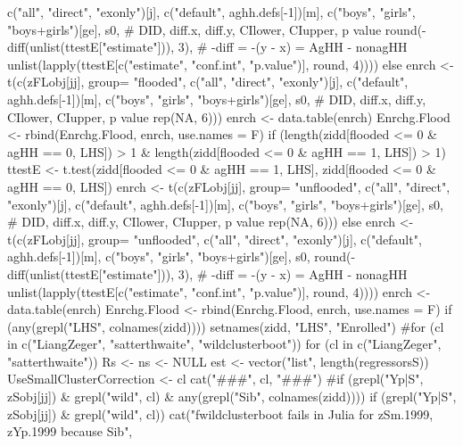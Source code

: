 \begin{Schunk}
\begin{Sinput}
{{{{{{{                  c("all", "direct", "exonly")[j], c("default", aghh.defs[-1])[m],
                  c("boys", "girls", "boys+girls")[ge], s0,
                    # DID, diff.x, diff.y, CIlower, CIupper, p value
                  round(-diff(unlist(ttestE["estimate"])), 3), # -diff = -(y - x) = AgHH - nonagHH
                  unlist(lapply(ttestE[c("estimate", "conf.int", "p.value")], round, 4))))
              } else 
                enrch <- t(c(zFLobj[jj], group= "flooded",
                  c("all", "direct", "exonly")[j], c("default", aghh.defs[-1])[m],
                  c("boys", "girls", "boys+girls")[ge], s0,
                    # DID, diff.x, diff.y, CIlower, CIupper, p value
                  rep(NA, 6)))
              enrch <- data.table(enrch)
              Enrchg.Flood <- rbind(Enrchg.Flood, enrch, use.names = F)
              if (length(zidd[flooded <= 0 & agHH == 0, LHS]) > 1 & 
                length(zidd[flooded <= 0 & agHH == 1, LHS]) > 1) {
                ttestE <- t.test(zidd[flooded <= 0 & agHH == 1, LHS], zidd[flooded <= 0 & agHH == 0, LHS])
                enrch <- t(c(zFLobj[jj], group= "unflooded",
                  c("all", "direct", "exonly")[j], c("default", aghh.defs[-1])[m],
                  c("boys", "girls", "boys+girls")[ge], s0,
                    # DID, diff.x, diff.y, CIlower, CIupper, p value
                  rep(NA, 6)))
              } else
                enrch <- t(c(zFLobj[jj], group= "unflooded", 
                  c("all", "direct", "exonly")[j], c("default", aghh.defs[-1])[m],
                  c("boys", "girls", "boys+girls")[ge], s0,
                  round(-diff(unlist(ttestE["estimate"])), 3), # -diff = -(y - x) = AgHH - nonagHH
                  unlist(lapply(ttestE[c("estimate", "conf.int", "p.value")], round, 4))))
              enrch <- data.table(enrch)
              Enrchg.Flood <- rbind(Enrchg.Flood, enrch, use.names = F)
              if (any(grepl("LHS", colnames(zidd)))) setnames(zidd, "LHS", "Enrolled")
              #for (cl in c("LiangZeger", "satterthwaite", "wildclusterboot")) 
              for (cl in c("LiangZeger", "satterthwaite")) 
              {
                Rs <- ns <- NULL
                est <- vector("list", length(regressorsS))
                UseSmallClusterCorrection <- cl
                cat("\n\n###", cl, "###\n\n")
                #if (grepl("Yp|S", zSobj[jj]) & grepl("wild", cl) & any(grepl("Sib", colnames(zidd)))) {
                if (grepl("Yp|S", zSobj[jj]) & grepl("wild", cl)) {
                  cat("fwildclusterboot fails in Julia for zSm.1999, zYp.1999 because Sib", 
}}}}}}}}}
\end{Sinput}
\end{Schunk}
